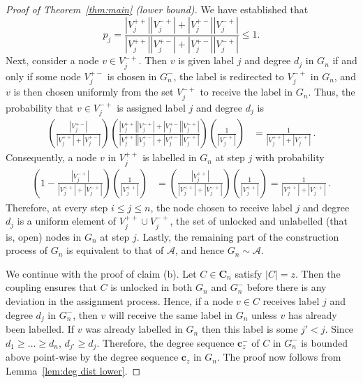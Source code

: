 \documentclass[12pt]{article}
\theoremstyle{definition}
\theoremstyle{remark}
\theoremstyle{remark}
\numberwithin{theorem}{section}
\newcommand{\abcdDist}{\ensuremath{\mathcal{A}}}
\begin{document}
\begin{proof}[Proof of Theorem~\ref{thm:main} (lower bound)]
We have established that 
$$
p_j = \frac{|V_j^{++}||V_j^{-+}| + |V_j^{+-}||V_j^{-+}|}{|V_j^{++}||V_j^{+-}| + |V_j^{+-}||V_j^{-+}|} \leq 1. 
$$
Next, consider a node $v \in V_j^{-+}$. Then $v$ is given label $j$ and degree $d_j$ in $G_n$ if and only if some node $V_j^{+-}$ is chosen in $G_n^-$, the label is redirected to $V_j^{-+}$ in $G_n$, and $v$ is then chosen uniformly from the set $V_j^{-+}$ to receive the label in $G_n$. Thus, the probability that $v \in V_j^{-+}$ is assigned label $j$ and degree $d_j$ is 
\begin{align*}
\left(\frac{|V_j^{+-}|}{|V_j^{++}| + |V_j^{+-}|} \right) \left( \frac{|V_j^{++}||V_j^{-+}| + |V_j^{+-}||V_j^{-+}|}{|V_j^{++}||V_j^{+-}| + |V_j^{+-}||V_j^{-+}|} \right) \left( \frac{1}{|V_j^{-+}|} \right)
&=
\frac{1}{|V_j^{++}| + |V_j^{-+}|} \,.
\end{align*}
Consequently, a node $v$ in $V_j^{++}$ is labelled in $G_n$ at step $j$ with probability 
\begin{align*}
\left( 1 - \frac{|V_j^{-+}|}{|V_j^{++}| + |V_j^{-+}|} \right) \left( \frac{1}{|V_j^{++}|} \right)
&=
\left(\frac{|V_j^{++}|}{|V_j^{++}| + |V_j^{-+}|} \right) \left( \frac{1}{|V_j^{++}|} \right)
=
\frac{1}{|V_j^{++}| + |V_j^{-+}|} \,.
\end{align*}
Therefore, at every step $i \leq j \leq n$, the node chosen to receive label $j$ and degree $d_j$ is a uniform element of $V_j^{++} \cup V_j^{-+}$, the set of unlocked and unlabelled (that is, open) nodes in $G_n$ at step $j$. Lastly, the remaining part of the construction process of $G_n$ is equivalent to that of $\abcdDist$, and hence $G_n \sim \abcdDist$. 

We continue with the proof of claim (b). Let $C \in \textbf{C}_n$ satisfy $|C| = z$. Then the coupling ensures that $C$ is unlocked in both $G_n$ and $G_n^-$ before there is any deviation in the assignment process. Hence, if a node $v \in C$ receives label $j$ and degree $d_j$ in $G_n^-$, then $v$ will receive the same label in $G_n$ unless $v$ has already been labelled. If $v$ was already labelled in $G_n$ then this label is some $j' < j$. Since $d_1 \geq \dots \geq d_n$, $d_{j'} \geq d_j$. Therefore, the degree sequence $\mathbf{c}_z^-$ of $C$ in $G_n^-$ is bounded above point-wise by the degree sequence $\mathbf{c}_z$ in $G_n$. The proof now follows from Lemma~\ref{lem:deg dist lower}. 
\end{proof}
\end{document}
